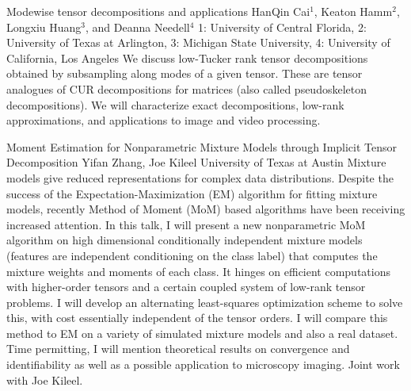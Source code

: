 \begin{addmargin}[2em]{0em}
\vspace{1.5ex}
\abs
{Modewise tensor decompositions and applications}
{HanQin Cai$^{1}$, Keaton Hamm$^{2}$, Longxiu Huang$^{3}$, and Deanna Needell$^{4}$}
{1: University of Central Florida, 2: University of Texas at Arlington, 3: Michigan State University, 4: University of California, Los Angeles}
{We discuss low-Tucker rank tensor decompositions obtained by subsampling along modes of a given tensor. These are tensor analogues of CUR decompositions for matrices (also called pseudoskeleton decompositions). We will characterize exact decompositions, low-rank approximations, and applications to image and video processing.}


\vspace{1.5ex}
\abs
{Moment Estimation for Nonparametric Mixture Models through Implicit Tensor Decomposition}
{Yifan Zhang, Joe Kileel}
{University of Texas at Austin}
{Mixture models give reduced representations for complex data distributions. Despite the success of the Expectation-Maximization (EM) algorithm for fitting mixture models, recently Method of Moment (MoM) based algorithms have been receiving increased attention. In this talk, I will present a new nonparametric MoM algorithm on high dimensional conditionally independent mixture models (features are independent conditioning on the class label) that computes the mixture weights and moments of each class. It hinges on efficient computations with higher-order tensors and a certain coupled system of low-rank tensor problems. I will develop an alternating least-squares optimization scheme to solve this, with cost essentially independent of the tensor orders. I will compare this method to EM on a variety of simulated mixture models and also a real dataset. Time permitting, I will mention theoretical results on convergence and identifiability as well as a possible application to microscopy imaging. Joint work with Joe Kileel.}
\end{addmargin}
